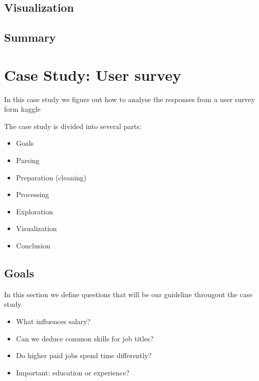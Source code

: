 \documentclass[letterpaper,10pt,english]{jupyterBook}
\begin{document}
\section{Visualization}
\label{\detokenize{c7_case_studies/Olympics:visualization}}

\section{Summary}
\label{\detokenize{c7_case_studies/Olympics:summary}}

\chapter{Case Study: User survey}
\label{\detokenize{c7_case_studies/UserSurvey:case-study-user-survey}}\label{\detokenize{c7_case_studies/UserSurvey::doc}}
\sphinxAtStartPar
In this case study we figure out how to analyse the responses from a user survey form kaggle

\sphinxAtStartPar
The case study is divided into several parts:
\begin{itemize}
\item {} 
\sphinxAtStartPar
Goals

\item {} 
\sphinxAtStartPar
Parsing

\item {} 
\sphinxAtStartPar
Preparation (cleaning)

\item {} 
\sphinxAtStartPar
Processing

\item {} 
\sphinxAtStartPar
Exploration

\item {} 
\sphinxAtStartPar
Visualization

\item {} 
\sphinxAtStartPar
Conclusion

\end{itemize}


\section{Goals}
\label{\detokenize{c7_case_studies/UserSurvey:goals}}
\sphinxAtStartPar
In this section we define questions that will be our guideline througout the case study
\begin{itemize}
\item {} 
\sphinxAtStartPar
What influences salary?

\item {} 
\sphinxAtStartPar
Can we deduce common skills for job titles?

\item {} 
\sphinxAtStartPar
Do higher paid jobs spend time differently?

\item {} 
\sphinxAtStartPar
Important: education or experience?

\end{itemize}
\end{document}
